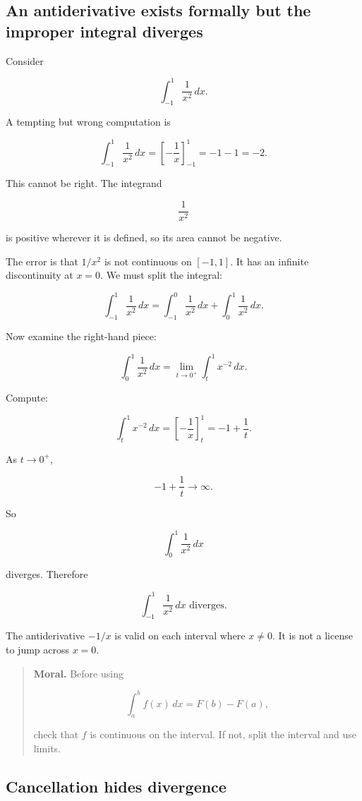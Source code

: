 \subsection{An antiderivative exists formally but the improper integral diverges}
\label{subsec:formal-antiderivative-improper-diverges}

Consider

\[
\int_{-1}^{1}\frac1{x^2}\,dx.
\]

A tempting but wrong computation is

\[
\int_{-1}^{1}\frac1{x^2}\,dx
=
\left[-\frac1x\right]_{-1}^{1}
=
-1-1
=
-2.
\]

This cannot be right.  The integrand

\[
\frac1{x^2}
\]

is positive wherever it is defined, so its area cannot be negative.

The error is that \(1/x^2\) is not continuous on \([-1,1]\).  It has an infinite
discontinuity at \(x=0\).  We must split the integral:

\[
\int_{-1}^{1}\frac1{x^2}\,dx
=
\int_{-1}^{0}\frac1{x^2}\,dx
+
\int_{0}^{1}\frac1{x^2}\,dx.
\]

Now examine the right-hand piece:

\[
\int_0^1 \frac1{x^2}\,dx
=
\lim_{t\to0^+}\int_t^1 x^{-2}\,dx.
\]

Compute:

\[
\int_t^1 x^{-2}\,dx
=
\left[-\frac1x\right]_t^1
=
-1+\frac1t.
\]

As \(t\to0^+\),

\[
-1+\frac1t\to\infty.
\]

So

\[
\int_0^1 \frac1{x^2}\,dx
\]

diverges.  Therefore

\[
\boxed{
\int_{-1}^{1}\frac1{x^2}\,dx
\text{ diverges.}
}
\]

The antiderivative \(-1/x\) is valid on each interval where \(x\neq0\).  It is not a
license to jump across \(x=0\).

\begin{quote}
\textbf{Moral.}
Before using

\[
\int_a^b f(x)\,dx=F(b)-F(a),
\]

check that \(f\) is continuous on the interval.  If not, split the interval and use limits.
\end{quote}

\subsection{Cancellation hides divergence}
\label{subsec:cancellation-hides-divergence}

